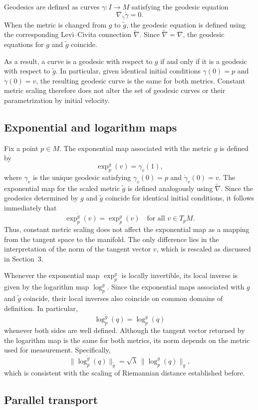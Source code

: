 \documentclass[11pt]{article}
\begin{document}
Geodesics are defined as curves $\gamma : I \to M$ satisfying the geodesic
equation
\[
\nabla_{\dot\gamma} \dot\gamma = 0.
\]
When the metric is changed from $g$ to $\tilde g$, the geodesic equation is
defined using the corresponding Levi--Civita connection $\tilde\nabla$. Since
$\tilde\nabla = \nabla$, the geodesic equations for $g$ and $\tilde g$ coincide.

As a result, a curve is a geodesic with respect to $g$ if and only if it is a
geodesic with respect to $\tilde g$. In particular, given identical initial
conditions $\gamma(0) = p$ and $\dot\gamma(0) = v$, the resulting geodesic curve
is the same for both metrics. Constant metric scaling therefore does not alter
the set of geodesic curves or their parametrization by initial velocity.

\subsection{Exponential and logarithm maps}

Fix a point $p \in M$. The exponential map associated with the metric $g$ is
defined by
\[
\exp_p^g(v) = \gamma_v(1),
\]
where $\gamma_v$ is the unique geodesic satisfying $\gamma_v(0) = p$ and
$\dot\gamma_v(0) = v$. The exponential map for the scaled metric $\tilde g$ is
defined analogously using $\tilde\nabla$. Since the geodesics determined by $g$ and $\tilde g$ coincide for identical
initial conditions, it follows immediately that
\[
\exp_p^{\tilde g}(v) = \exp_p^g(v)
\quad \text{for all } v \in T_p M.
\]
Thus, constant metric scaling does not affect the exponential map as a mapping
from the tangent space to the manifold. The only difference lies in the
interpretation of the norm of the tangent vector $v$, which is rescaled as
discussed in Section~3.


Whenever the exponential map $\exp_p^g$ is locally invertible, its local inverse
is given by the logarithm map $\log_p^g$. Since the exponential maps associated
with $g$ and $\tilde g$ coincide, their local inverses also coincide on common
domains of definition. In particular,
\[
\log_p^{\tilde g}(q) = \log_p^g(q)
\]
whenever both sides are well defined. Although the tangent vector returned by the logarithm map is the same for both
metrics, its norm depends on the metric used for measurement. Specifically,
\[
\|\log_p^{\tilde g}(q)\|_{\tilde g}
= \sqrt{\lambda}\,\|\log_p^g(q)\|_g,
\]
which is consistent with the scaling of Riemannian distance established before.

\subsection{Parallel transport}
\end{document}
